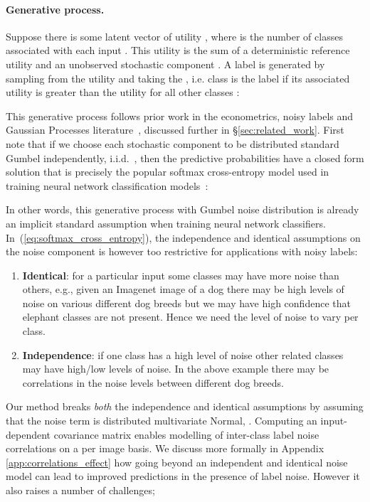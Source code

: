 \documentclass[final]{cvpr}
\begin{document}
\paragraph{Generative process.}

Suppose there is some latent vector of utility , where   is the number of classes associated with each input .
This utility is the sum of a deterministic reference utility  and an unobserved stochastic component . A label is generated by sampling from the utility and taking the , i.e. class  is the label if its associated utility is greater than the utility for all other classes :



This generative process follows prior work in the econometrics, noisy labels and Gaussian Processes literature~\cite{train2009discrete,kendall2017uncertainties,collier2020analysis,hernandez2014mind,williams2006gaussian}, discussed further in \S \ref{sec:related_work}. First note that if we choose each stochastic component to be distributed standard Gumbel independently,  i.i.d.\ , then the predictive probabilities  have a closed form solution that is precisely the popular softmax cross-entropy model used in training neural network classification models~\cite{train2009discrete,collier2020analysis}: 



In other words, this generative process with Gumbel noise distribution is already an implicit standard assumption when training neural network classifiers. In~(\ref{eq:softmax_cross_entropy}), the independence and identical assumptions on the noise component is however too restrictive for applications with noisy labels:
\begin{enumerate}
    \item \textbf{Identical}: for a particular input  some classes may have more noise than others, e.g., given an Imagenet image of a dog there may be high levels of noise on various different dog breeds but we may have high confidence that elephant classes are not present. Hence we need the level of noise to vary per class.
    \item \textbf{Independence}: if one class has a high level of noise other related classes may have high/low levels of noise. In the above example there may be correlations in the noise levels between different dog breeds.
\end{enumerate}

Our method breaks \emph{both} the independence and identical assumptions by assuming that the noise term  is distributed multivariate Normal, . Computing an input-dependent covariance matrix enables modelling of inter-class label noise correlations on a per image basis. We discuss more formally in Appendix \ref{app:correlations_effect} how going beyond an independent and identical noise model can lead to improved predictions in the presence of label noise. However it also raises a number of challenges;
\end{document}
